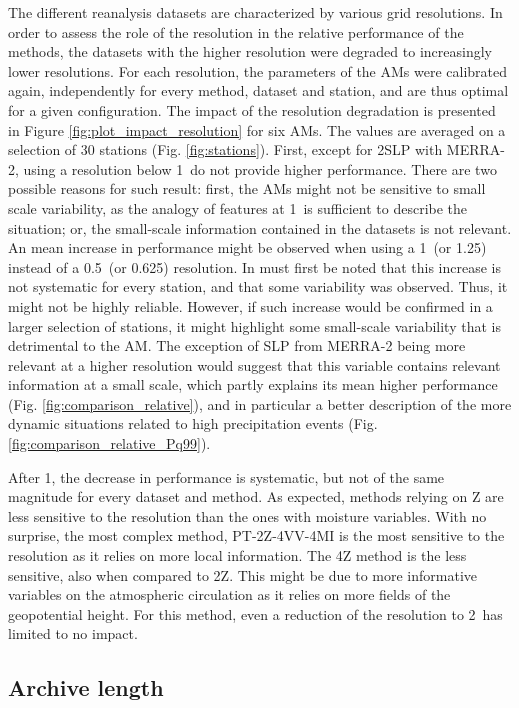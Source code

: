 \documentclass{ametsoc}
\begin{document}
The different reanalysis datasets are characterized by various grid resolutions. In order to assess the role of the resolution in the relative performance of the methods, the datasets with the higher resolution were degraded to increasingly lower resolutions. For each resolution, the parameters of the AMs were calibrated again, independently for every method, dataset and station, and are thus optimal for a given configuration. The impact of the resolution degradation is presented in Figure \ref{fig:plot_impact_resolution} for six AMs. The values are averaged on a selection of 30 stations (Fig. \ref{fig:stations}). First, except for 2SLP with MERRA-2, using a resolution below 1\degree\ do not provide higher performance. There are two possible reasons for such result: first, the AMs might not be sensitive to small scale variability, as the analogy of features at 1\degree\ is sufficient to describe the situation; or, the small-scale information contained in the datasets is not relevant. An mean increase in performance might be observed when using a 1\degree\ (or 1.25\degree) instead of a 0.5\degree\ (or 0.625\degree) resolution. In must first be noted that this increase is not systematic for every station, and that some variability was observed. Thus, it might not be highly reliable. However, if such increase would be confirmed in a larger selection of stations, it might highlight some small-scale variability that is detrimental to the AM. The exception of SLP from MERRA-2 being more relevant at a higher resolution would suggest that this variable contains relevant information at a small scale, which partly explains its mean higher performance (Fig. \ref{fig:comparison_relative}), and in particular a better description of the more dynamic situations related to high precipitation events (Fig. \ref{fig:comparison_relative_Pq99}).

After 1\degree, the decrease in performance is systematic, but not of the same magnitude for every dataset and method. As expected, methods relying on Z are less sensitive to the resolution than the ones with moisture variables. With no surprise, the most complex method, PT-2Z-4VV-4MI is the most sensitive to the resolution as it relies on more local information. The 4Z method is the less sensitive, also when compared to 2Z. This might be due to more informative variables on the atmospheric circulation as it relies on more fields of the geopotential height. For this method, even a reduction of the resolution to 2\degree\ has limited to no impact.


\subsection{Archive length}
\end{document}
